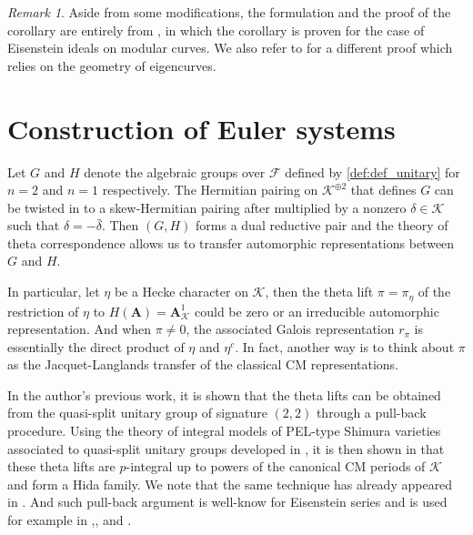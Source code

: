 \documentclass[leqno]{amsart}
\theoremstyle{definition}
\theoremstyle{remark}
\newtheorem{rem}[thm]{Remark}
\newcommand{\A}{\mathbf A}
\newcommand{\F}{{\mathcal{F}}} %
\newcommand{\K}{{\mathcal{K}}} %
\begin{document}
\begin{rem}
Aside from some modifications,
the formulation and the proof of the corollary
are entirely from \cite[Prop. 6.3.5]{urban},
in which the corollary is proven 
for the case of Eisenstein ideals on modular curves.
We also refer to \cite[Thm 3.4.1]{urban}
for a different proof 
which relies on the geometry of eigencurves.
\end{rem}


\section{Construction of Euler systems}

Let $G$ and $H$ denote the algebraic groups over $\F$
defined by \eqref{def:def_unitary}
for $n=2$ and $n=1$ respectively.
The Hermitian pairing on $\K^{\oplus 2}$
that defines $G$ can be twisted in to 
a skew-Hermitian pairing after multiplied by 
a nonzero $\delta\in \K$ such that $\delta=-\bar{\delta}$.
Then $(G, H)$ forms a dual reductive pair
and the theory of theta correspondence 
allows us to transfer automorphic representations
between $G$ and $H$.

In particular, 
let $\eta$ be a Hecke character on $\K$,
then the theta lift $\pi=\pi_\eta$ of the restriction of $\eta$
to $H(\A)=\A_{\K}^1$ could be zero or an irreducible 
automorphic representation. 
And when $\pi\neq 0$, the associated Galois representation
$r_\pi$ is essentially the direct product of $\eta$ and $\eta^c$.
In fact, another way is to think about $\pi$ as the Jacquet-Langlands
transfer of the classical CM representations.

In the author's previous work,
it is shown that the theta lifts
can be obtained from the quasi-split unitary group
of signature $(2,2)$ through a pull-back procedure.
Using the theory of integral models
of PEL-type Shimura varieties
associated to quasi-split unitary groups
developed in \cite{Hida04},
it is then shown in \cite{lee}
that these theta lifts 
are $p$-integral up to powers of the canonical
CM periods of $\K$
and form a Hida family.
We note that the same technique has already appeared in \cite{wan}.
And such pull-back argument is well-know 
for Eisenstein series and is used for example in 
\cite{SU},\cite{EHLS}, and \cite{Hsieh2014}.
\end{document}
